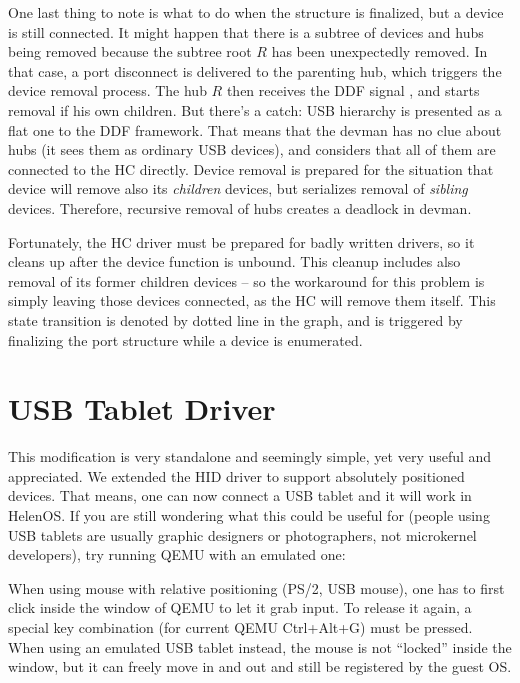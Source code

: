 One last thing to note is what to do when the structure is finalized, but
a device is still connected. It might happen that there is a subtree of devices
and hubs being removed because the subtree root $R$ has been unexpectedly
removed. In that case, a port disconnect is delivered to the parenting hub,
which triggers the device removal process. The hub $R$ then receives the DDF
signal , and starts removal if his own children. But
there's a catch: USB hierarchy is presented as a flat one to the DDF framework.
That means that the devman has no clue about hubs (it sees them as ordinary USB
devices), and considers that all of them are connected to the HC directly.
Device removal is prepared for the situation that device will remove also its
\textit{children} devices, but serializes removal of \textit{sibling} devices.
Therefore, recursive removal of hubs creates a deadlock in devman.

Fortunately, the HC driver must be prepared for badly written drivers, so it
cleans up after the device function is unbound. This cleanup includes also
removal of its former children devices -- so the workaround for this problem is
simply leaving those devices connected, as the HC will remove them itself. This
state transition is denoted by dotted line in the graph, and is triggered by
finalizing the port structure while a device is enumerated.

\section{USB Tablet Driver}

This modification is very standalone and seemingly simple, yet very useful and
appreciated. We extended the HID driver to support absolutely positioned
devices. That means, one can now connect a USB tablet and it will work in
HelenOS. If you are still wondering what this could be useful for (people using
USB tablets are usually graphic designers or photographers, not microkernel
developers), try running QEMU with an emulated one:


When using mouse with relative positioning (PS/2, USB mouse), one has to first
click inside the window of QEMU to let it grab input. To release it again,
a special key combination (for current QEMU Ctrl+Alt+G) must be pressed. When
using an emulated USB tablet instead, the mouse is not ``locked'' inside the
window, but it can freely move in and out and still be registered by the guest
OS.

